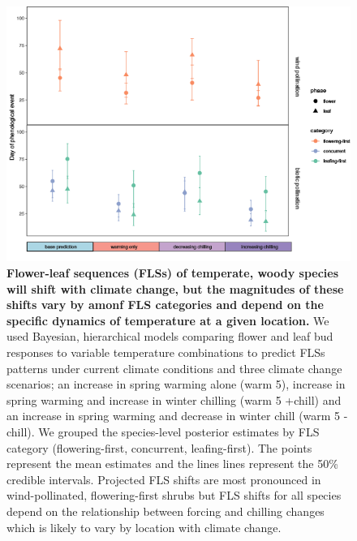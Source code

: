 \documentclass[11pt]{article}\usepackage[]{graphicx}\usepackage[]{color}
\begin{document}
{\pagebreak
\begin{figure}[h!]
    \centering
 \includegraphics[width=.8\textwidth]{..//Plots/Flobuds_manuscript_figs/postergroups2.png}
    \caption{\textbf{Flower-leaf sequences (FLSs) of temperate, woody species will shift with climate change, but the magnitudes of these shifts vary by amonf FLS categories and depend on the specific dynamics of temperature at a given location.} We used Bayesian, hierarchical models comparing flower and leaf bud responses to variable temperature combinations to predict FLSs patterns under current climate conditions and three climate change scenarios;  an increase in spring warming alone (warm 5), increase in spring warming and increase in winter chilling (warm 5 +chill) and an increase in spring warming and decrease in winter chill (warm 5 -chill). We grouped the species-level posterior estimates by FLS category (flowering-first, concurrent, leafing-first). The points represent the mean estimates and the lines lines represent the 50\% credible intervals. Projected FLS shifts are most pronounced in wind-pollinated, flowering-first shrubs but FLS shifts for all species depend on the relationship between forcing and chilling changes which is likely to vary by location with climate change.}
    \label{fig:preddy}
\end{figure}



}
\end{document}
